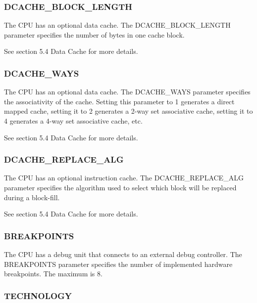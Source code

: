 \subsubsection{DCACHE\_BLOCK\_LENGTH}\label{dcache_block_length}

The CPU has an optional data cache. The DCACHE\_BLOCK\_LENGTH parameter
specifies the number of bytes in one cache block.

\protect\hypertarget{_Toc326677740}{}{\protect\hypertarget{_Toc327108326}{}{}}See
section 5.4 Data Cache for more details.

\subsubsection{DCACHE\_WAYS}\label{dcache_ways}

The CPU has an optional data cache. The DCACHE\_WAYS parameter specifies
the associativity of the cache. Setting this parameter to 1 generates a
direct mapped cache, setting it to 2 generates a 2-way set associative
cache, setting it to 4 generates a 4-way set associative cache, etc.

\protect\hypertarget{_Toc326677741}{}{\protect\hypertarget{_Toc327108327}{}{}}See
section 5.4 Data Cache for more details.

\subsubsection{DCACHE\_REPLACE\_ALG}\label{dcache_replace_alg}

The CPU has an optional instruction cache. The DCACHE\_REPLACE\_ALG
parameter specifies the algorithm used to select which block will be
replaced during a block-fill.

\protect\hypertarget{_Toc326677742}{}{\protect\hypertarget{_Toc327108328}{}{}}See
section 5.4 Data Cache for more details.

\subsubsection{BREAKPOINTS}\label{breakpoints}

The CPU has a debug unit that connects to an external debug controller.
The BREAKPOINTS parameter specifies the number of implemented hardware
breakpoints. The maximum is 8.

\subsubsection{TECHNOLOGY}\label{technology}

